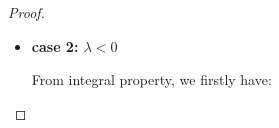 \begin{proof}
\begin{itemize}
	\item \textbf{case 2: $\lambda < 0$}








	From integral property, we firstly have:


\end{itemize}
\end{proof}
